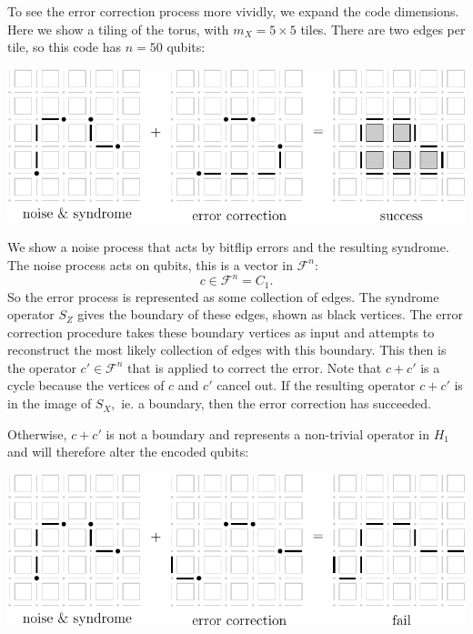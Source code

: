 \documentclass[11pt,twoside,openright]{report}
\newcommand{\Field}{\mathcal{F}}
\begin{document}
To see the error correction process more vividly, we expand the
code dimensions.
Here we show a tiling of the torus, with $m_X = 5\times 5$ tiles.
There are two edges per tile, so this code has $n=50$ qubits:
\begin{center}
\includegraphics[width=0.8\columnwidth]{pic-toric-suc.pdf}
\end{center}
We show a noise process that acts by bitflip errors
and the resulting syndrome.
The noise process acts on qubits, this is a vector in $\Field^n:$
$$
    c \in \Field^n = C_1.
$$
So the error process is represented as some collection of edges.
The syndrome operator $S_Z$ gives the boundary of these
edges, shown as black vertices.
The error correction procedure takes these boundary vertices
as input and attempts to reconstruct the most likely collection of
edges with this boundary. This then is the operator $c'\in\Field^n$
that is applied to correct the error.
Note that $c+c'$ is a cycle because the vertices of $c$ and $c'$ cancel out.
If the resulting operator $c+c'$ is in the image of $S_X,$
ie. a boundary, then the error correction has succeeded.

Otherwise, $c+c'$ is not a boundary and represents a non-trivial
operator in $H_1$ and will therefore alter the encoded qubits:
\begin{center}
\includegraphics[width=0.8\columnwidth]{pic-toric-fail.pdf}
\end{center}
\end{document}
